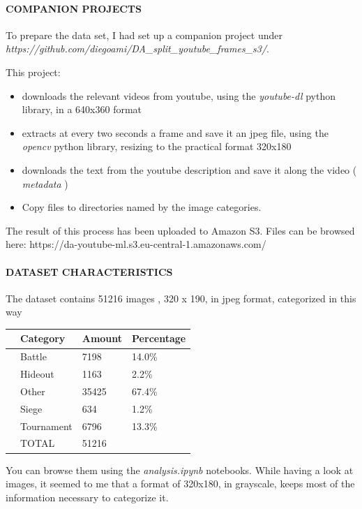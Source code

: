 \documentclass[
]{article}
\providecommand{\tightlist}{%
  \setlength{\itemsep}{0pt}\setlength{\parskip}{0pt}}
\begin{document}
\hypertarget{companion-projects}{%
\paragraph{COMPANION PROJECTS}\label{companion-projects}}

To prepare the data set, I had set up a companion project under
\emph{https://github.com/diegoami/DA\_split\_youtube\_frames\_s3/}.

This project:

\begin{itemize}
\tightlist
\item
  downloads the relevant videos from youtube, using the
  \emph{youtube-dl} python library, in a 640x360 format
\item
  extracts at every two seconds a frame and save it an jpeg file, using
  the \emph{opencv} python library, resizing to the practical format
  320x180
\item
  downloads the text from the youtube description and save it along the
  video ( \emph{metadata} )
\item
  Copy files to directories named by the image categories.
\end{itemize}

The result of this process has been uploaded to Amazon S3. Files can be
browsed here: https://da-youtube-ml.s3.eu-central-1.amazonaws.com/

\hypertarget{dataset-characteristics}{%
\paragraph{DATASET CHARACTERISTICS}\label{dataset-characteristics}}

The dataset contains 51216 images , 320 x 190, in jpeg format,
categorized in this way

\begin{longtable}[]{@{}llll@{}}
\toprule
& Category & Amount & Percentage\tabularnewline
\midrule
\endhead
& Battle & 7198 & 14.0\%\tabularnewline
& Hideout & 1163 & 2.2\%\tabularnewline
& Other & 35425 & 67.4\%\tabularnewline
& Siege & 634 & 1.2\%\tabularnewline
& Tournament & 6796 & 13.3\%\tabularnewline
& TOTAL & 51216 &\tabularnewline
\bottomrule
\end{longtable}

You can browse them using the \emph{analysis.ipynb} notebooks. While
having a look at images, it seemed to me that a format of 320x180, in
grayscale, keeps most of the information necessary to categorize it.
\end{document}
